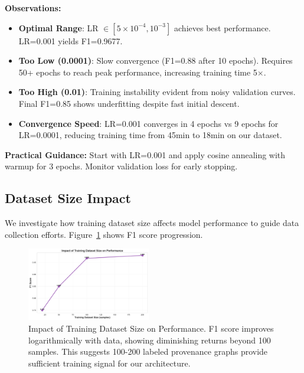\documentclass[conference]{IEEEtran}
\begin{document}
\textbf{Observations:}
\begin{itemize}
    \item \textbf{Optimal Range}: LR $\in [5\times10^{-4}, 10^{-3}]$ achieves best performance. LR=0.001 yields F1=0.9677.
    
    \item \textbf{Too Low (0.0001)}: Slow convergence (F1=0.88 after 10 epochs). Requires 50+ epochs to reach peak performance, increasing training time 5$\times$.
    
    \item \textbf{Too High (0.01)}: Training instability evident from noisy validation curves. Final F1=0.85 shows underfitting despite fast initial descent.
    
    \item \textbf{Convergence Speed}: LR=0.001 converges in 4 epochs vs 9 epochs for LR=0.0001, reducing training time from 45min to 18min on our dataset.
\end{itemize}

\textbf{Practical Guidance:} Start with LR=0.001 and apply cosine annealing with warmup for 3 epochs. Monitor validation loss for early stopping.

\subsection{Dataset Size Impact}

We investigate how training dataset size affects model performance to guide data collection efforts. Figure~\ref{fig:dataset_size} shows F1 score progression.

\begin{figure}[!t]
\centering
\includegraphics[width=0.48\textwidth]{experiments/results/dataset_size_impact.pdf}
\caption{Impact of Training Dataset Size on Performance. F1 score improves logarithmically with data, showing diminishing returns beyond 100 samples. This suggests 100-200 labeled provenance graphs provide sufficient training signal for our architecture.}
\label{fig:dataset_size}
\end{figure}
\end{document}
